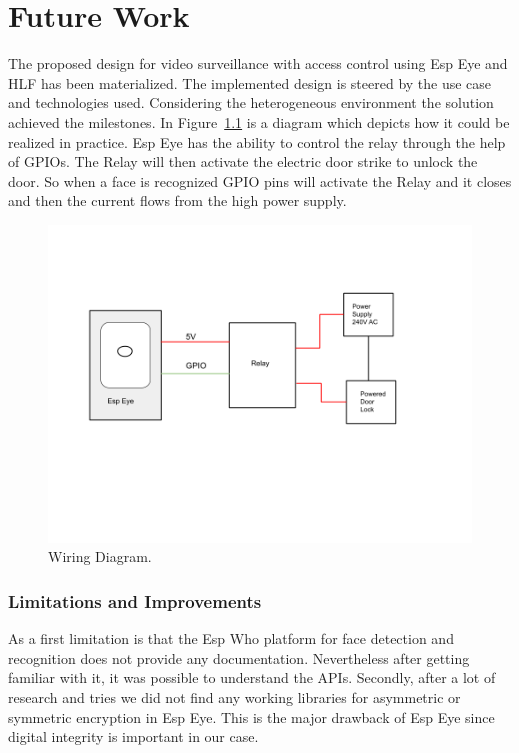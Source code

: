 \chapter{Future Work}


The proposed design for video surveillance with access control using Esp Eye and HLF has been materialized. The implemented design is steered by the use case and technologies used. Considering the heterogeneous environment the solution achieved the milestones. 
In Figure~\ref{fig:relay} is a diagram which depicts how it could be realized in practice. Esp Eye has the ability to control the relay through the help of GPIOs. The Relay will then activate the electric door strike to unlock the door. 
So when a face is recognized GPIO pins will activate the Relay and it closes and then the current flows from the high power supply. 

\begin{figure}[!htb]
    \centering
    \includegraphics[width=1\textwidth]{figures/Relay.png}
    \caption{Wiring Diagram.}
    \label{fig:relay}
\end{figure}


\subsection{Limitations and Improvements}

As a first limitation is that the Esp Who platform for face detection and recognition does not provide any documentation. Nevertheless after getting familiar with it, it was possible to understand the APIs. Secondly, after a lot of research and tries we did not find any working libraries for asymmetric or symmetric encryption in Esp Eye. This is the major drawback of Esp Eye since digital integrity is important in our case. 

